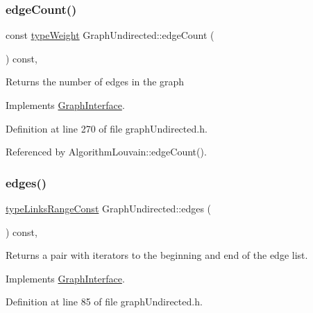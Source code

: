 \subsubsection{\texorpdfstring{edge\+Count()}{edgeCount()}}
{\footnotesize\ttfamily const \hyperlink{edge_8h_a2e7ea3be891ac8b52f749ec73fee6dd2}{type\+Weight} Graph\+Undirected\+::edge\+Count (\begin{DoxyParamCaption}{ }\end{DoxyParamCaption}) const\hspace{0.3cm}{\ttfamily [inline]}, {\ttfamily [virtual]}}

\begin{DoxyReturn}{Returns}
the number of edges in the graph 
\end{DoxyReturn}


Implements \hyperlink{classGraphInterface_a057eb801c6d7f594cdedc205a0d081a9}{Graph\+Interface}.



Definition at line 270 of file graph\+Undirected.\+h.



Referenced by Algorithm\+Louvain\+::edge\+Count().

\mbox{\label{classGraphUndirected_aa6fa3435fb456f1a7e9642b631878431}} 
\subsubsection{\texorpdfstring{edges()}{edges()}}
{\footnotesize\ttfamily \hyperlink{graphInterface_8h_ae8d27008f15586bbf419af7ad2e0a48a}{type\+Links\+Range\+Const} Graph\+Undirected\+::edges (\begin{DoxyParamCaption}{ }\end{DoxyParamCaption}) const\hspace{0.3cm}{\ttfamily [inline]}, {\ttfamily [virtual]}}

\begin{DoxyReturn}{Returns}
a pair with iterators to the beginning and end of the edge list. 
\end{DoxyReturn}


Implements \hyperlink{classGraphInterface_a2ac54d73e88516d6793a9a6fc0e434ee}{Graph\+Interface}.



Definition at line 85 of file graph\+Undirected.\+h.



